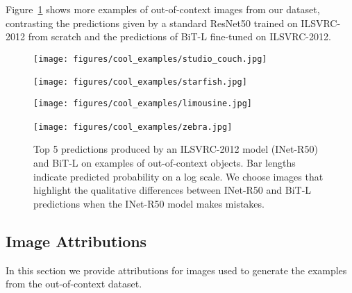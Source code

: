 \documentclass[runningheads]{llncs}
\newcommand{\name}{{BiT}}
\newcommand{\imagenet}{{ILSVRC-2012}}
\begin{document}
Figure~\ref{fig:out-of-context-examples-appendix} shows more examples of out-of-context images from our dataset, contrasting the predictions given by a standard ResNet50 trained on \imagenet{} from scratch and the predictions of \name{}-L fine-tuned on \imagenet{}.

\begin{figure}[t]
\begin{center}
   \texttt{[image: figures/cool\_examples/studio\_couch.jpg]}
\end{center}\vspace{-40pt}\begin{center}
   \texttt{[image: figures/cool\_examples/starfish.jpg]}~
\end{center}\vspace{-40pt}\begin{center}
   \texttt{[image: figures/cool\_examples/limousine.jpg]}
\end{center}\vspace{-40pt}\begin{center}
   \texttt{[image: figures/cool\_examples/zebra.jpg]}~
\end{center}\vspace{-40pt}\caption{Top 5 predictions produced by an \imagenet{} model (INet-R50) and \name{}-L on examples of out-of-context objects. 
Bar lengths indicate predicted probability on a log scale. We choose images that highlight the qualitative differences between INet-R50 and BiT-L predictions when the INet-R50 model makes mistakes.}
\label{fig:out-of-context-examples-appendix}
\end{figure}

\subsection{Image Attributions}
In this section we provide attributions for images used to generate the examples from the out-of-context dataset.
\end{document}
